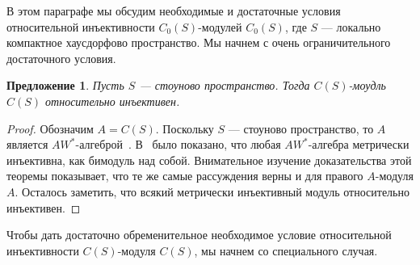 \documentclass[12pt]{article}
\newtheorem{proposition}[theorem]{Предложение}
\begin{document}
В этом параграфе мы обсудим необходимые и достаточные условия относительной
инъективности $C_0(S)$-модулей $C_0(S)$, где $S$ --- локально компактное
хаусдорфово пространство. Мы начнем с очень ограничительного достаточного
условия.

\begin{proposition}\label{SStonImplRelInjCSModCS} Пусть $S$ --- стоуново
    пространство. Тогда $C(S)$-моудль $C(S)$ относительно инъективен.
\end{proposition}
\begin{proof} Обозначим $A=C(S)$. Поскольку $S$ --- стоуново пространство, то
    $A$ является $AW^*$-алгеброй~\cite[глава 1, параграф 7]{BerbBaerStRng}.
    В~\cite[теорема 2]{TakHanBanThAndJordDecomOfModMap} было показано, что любая
    $AW^*$-алгебра метрически инъективна, как бимодуль над собой. Внимательное
    изучение доказательства этой теоремы показывает, что те же самые рассуждения
    верны и для правого $A$-модуля $A$. Осталось заметить, что всякий метрически
    инъективный модуль относительно инъективен.
\end{proof}

Чтобы дать достаточно обременительное необходимое условие относительной
инъективности $C(S)$-модуля $C(S)$, мы начнем со специального случая.
\end{document}
